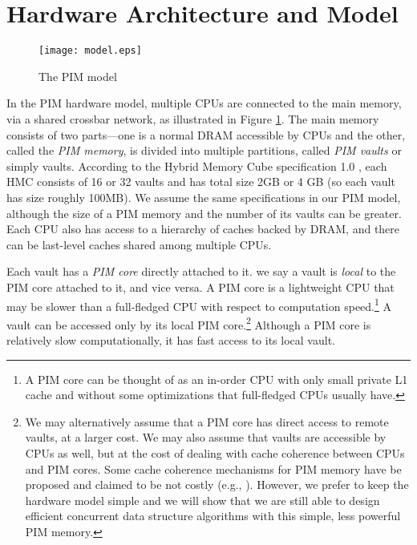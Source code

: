 \section{Hardware Architecture and Model}


\label{section:hardware_model}

\begin{figure}[ht!]
\centering
\texttt{[image: model.eps]}
\caption{The PIM model}
\label{figure:model}
\end{figure}

In the PIM hardware model, multiple CPUs are connected to the main
memory, via a shared crossbar network, as illustrated in Figure \ref{figure:model}.
The main memory consists of two parts---one is a normal DRAM accessible by CPUs 
and the other, called the \textit{PIM memory}, is divided into multiple partitions, 
called \textit{PIM vaults} or simply vaults.  
According to the Hybrid Memory Cube specification 1.0 \cite{website:HMC}, each HMC consists of 16 or 
32 vaults and has total size 2GB or 4 GB (so each vault has size roughly 100MB). 
We assume the same specifications in our PIM model, although the size of a PIM memory and 
the number of its vaults can be greater. 
Each CPU also has access to a hierarchy of caches backed by DRAM,
and there can be last-level caches shared among multiple CPUs. 

Each vault has a \textit{PIM core} directly attached to it.
we say a vault is \textit{local} to the PIM core attached to it, and vice versa.
A PIM core is a lightweight CPU that may be slower than a full-fledged CPU
with respect to computation speed.\footnote{
A PIM core can be thought of as an in-order CPU with only small private L1 cache and 
without some optimizations that full-fledged CPUs usually have.}
A vault can be accessed only by its local PIM core.\footnote{
We may alternatively assume that a PIM core has direct access to remote vaults, at a larger cost. 
We may also assume that vaults are accessible by CPUs as well, 
but at the cost of dealing with cache coherence between CPUs and PIM cores. 
Some cache coherence mechanisms for PIM memory have be proposed 
and claimed to be not costly (e.g., \cite{boroumand2016}). 
However, we prefer to keep the hardware model simple and we will show that we are still able to 
design efficient concurrent data structure algorithms with this simple, less powerful PIM memory.}
Although a PIM core is relatively slow computationally, it has fast access to its local vault.

